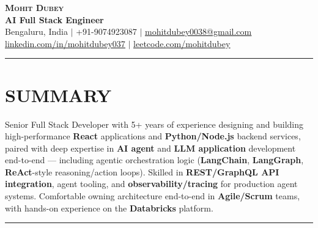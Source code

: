 \documentclass[100pt,a4paper]{article}
\newcommand{\sectionline}{
\begin{center}
\vspace{-10pt}
\rule{1\textwidth}{0.5pt}
\end{center}
\vspace{1pt}
}
\begin{document}
\begin{center}
    \textbf{\Huge \scshape Mohit Dubey} \\ \vspace{4pt}
    \textbf{AI Full Stack Engineer } \\ \vspace{6pt}
    \small Bengaluru, India $|$ +91-9074923087 $|$ \href{mailto:mohitdubey0038@gmail.com}{\underline{mohitdubey0038@gmail.com}} \\
    \href{https://www.linkedin.com/in/mohit-dubey-037/}{\underline{linkedin.com/in/mohitdubey037}} $|$ \href{https://leetcode.com/u/mohitdubey037/}
    {\underline{leetcode.com/mohitdubey}}
\end{center}


\sectionline
\section*{SUMMARY}
Senior Full Stack Developer with 5+ years of experience designing and building high-performance \textbf{React} applications and \textbf{Python/Node.js} backend services, paired with deep expertise in \textbf{AI agent} and \textbf{LLM application} development end-to-end — including agentic orchestration logic (\textbf{LangChain}, \textbf{LangGraph}, \textbf{ReAct}-style reasoning/action loops). Skilled in \textbf{REST/GraphQL API integration}, agent tooling, and \textbf{observability/tracing} for production agent systems. Comfortable owning architecture end-to-end in \textbf{Agile/Scrum} teams, with hands-on experience on the \textbf{Databricks} platform.

\sectionline
\end{document}
